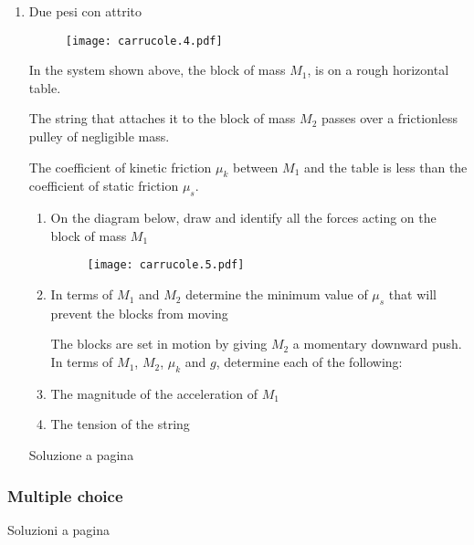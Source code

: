 \begin{enumerate}

\item{Due pesi con attrito} \label{ex_2pca}


\begin{figure}[h]
\centering
\texttt{[image: carrucole.4.pdf]}
\end{figure}

In the system shown above, the block of mass $M_1$, is on a rough horizontal table.

The string that attaches it to the block of mass $M_2$ passes over a frictionless pulley of negligible mass.

The coefficient of kinetic friction $\mu_k$ between $M_1$ and the table is less than the coefficient of static friction $\mu_s$.

\begin{enumerate}
\item On the diagram below, draw and identify all the forces acting on the block of mass $M_1$
\begin{figure}[h]
\centering
\texttt{[image: carrucole.5.pdf]}
\end{figure}
\item In terms of $M_1$ and $M_2$ determine the minimum value of $\mu_s$ that will prevent the blocks from moving

\vspace{1cm}
The blocks are set in motion by giving $M_2$ a momentary downward push.  In terms of $M_1$, $M_2$, $\mu_k$ and $g$, determine each of the following:

\item The magnitude of the acceleration of $M_1$
\item The tension of the string
\end{enumerate}

Soluzione a pagina \pageref{s_2pca}

\end{enumerate}

\subsubsection{Multiple choice} \label{q_mcmc}

Soluzioni a pagina \pageref{s_mcmc}

